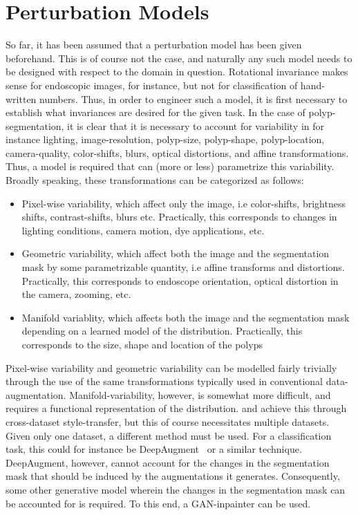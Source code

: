 \section{Perturbation Models}
So far, it has been assumed that a perturbation model has been given beforehand. This is of course not the case, and naturally any such model needs to be designed with respect to the domain in question. Rotational invariance makes sense for endoscopic images, for instance, but not for classification of hand-written numbers. Thus, in order to engineer such a model, it is first necessary to establish what invariances are desired for the given task. In the case of polyp-segmentation, it is clear that it is necessary to account for variability in for instance lighting, image-resolution, polyp-size, polyp-shape, polyp-location, camera-quality, color-shifts, blurs, optical distortions, and affine transformations. Thus, a model is required that can (more or less) parametrize this variability. Broadly speaking, these transformations can be categorized as follows:
\begin{itemize}
    \item Pixel-wise variability, which affect only the image, i.e color-shifts, brightness shifts, contrast-shifts,  blurs etc. Practically, this corresponds to changes in lighting conditions, camera motion, dye applications, etc.
    \item Geometric variability, which affect both the image and the segmentation mask by some parametrizable quantity, i.e affine transforms and distortions. Practically, this corresponds to endoscope orientation, optical distortion in the camera, zooming, etc. 
    \item Manifold variablity, which affects both the image and the segmentation mask depending on a learned model of the distribution. Practically, this corresponds to the size, shape and location of the polyps
\end{itemize}
Pixel-wise variability and geometric variability can be modelled fairly trivially through the use of the same transformations typically used in conventional data-augmentation. Manifold-variability, however, is somewhat more difficult, and requires a functional representation of the distribution. \cite{modelbased} and \cite{cyclegan} achieve this through cross-dataset style-transfer, but this of course necessitates multiple datasets. Given only one dataset, a different method must be used. For a classification task, this could for instance be DeepAugment~\cite{deepaugment} or a similar technique. DeepAugment, however, cannot account for the changes in the segmentation mask that should be induced by the augmentations it generates. Consequently, some other generative model wherein the changes in the segmentation mask can be accounted for is required. To this end, a GAN-inpainter can be used. 

